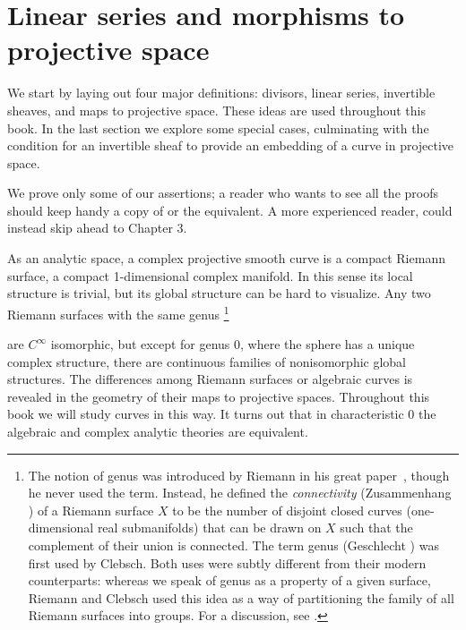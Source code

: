 

\chapter{Linear series and morphisms to projective space}\label{linear series}

We start by laying
out four major definitions:
divisors, linear series, invertible sheaves, and maps to projective space. 
These ideas are used
throughout
this
book. In the last section 
we explore some special cases, culminating with
the condition for an invertible sheaf to provide an embedding of a curve in projective space.

We prove only some of our assertions; a reader who wants to see
all the proofs should keep
handy
a copy of \cite{Hartshorne1977} or the equivalent. 
A
more experienced reader,
could instead skip ahead to Chapter 3.

As an analytic space, a complex projective smooth curve is a compact
Riemann surface,
%
a compact
1-dimensional complex
manifold. In this sense its local structure is trivial,
but its
global structure
can be hard to visualize. 
%
%
Any two Riemann surfaces with the same genus%
\footnote{The notion of genus was introduced by Riemann in his great paper~\citeyear{Riemann}, though he never used the term. Instead,
he defined the \emph{connectivity} 
(Zusammenhang%
) 
of a Riemann surface $X$
to be the number 
of disjoint 
closed curves 
(one-dimensional real submanifolds) that can be drawn on $X$ such that 
the complement of their union
is connected. The term genus 
(Geschlecht%
)
was first used by
\def\marginpar#1{}%
Clebsch.
Both uses 
were 
subtly different
from their modern counterparts: whereas 
we speak of genus as a property of a given surface, Riemann and Clebsch 
used this idea as a way of partitioning the family of all Riemann
surfaces into groups.
For a discussion, see
\cite{MR4175877}.
\par
}

are $C^\infty$ isomorphic,
but except for genus 0, where the sphere has a unique complex structure,
there are continuous families of 
nonisomorphic 
global structures.  The differences among Riemann surfaces or
algebraic curves is revealed in 
the
geometry of their maps to projective spaces. Throughout this book we
will study curves in this way. 
It turns out that in characteristic 0 the algebraic and complex analytic theories are equivalent. 

